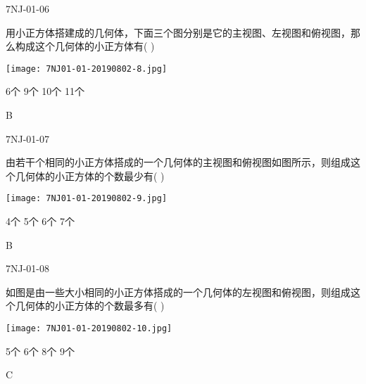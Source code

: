 \begin{defproblem}{7NJ-01-06}%
\begin{onlyproblem}%
用小正方体搭建成的几何体，下面三个图分别是它的主视图、左视图和俯视图，那么构成这个几何体的小正方体有(    )
\begin{center}
\texttt{[image: 7NJ01-01-20190802-8.jpg]}
\end{center}

\xx
{6个}
{9个}
{10个}
{11个}

\end{onlyproblem}%
\begin{onlysolution}%
\begin{solution}%
B
\end{solution}%
\end{onlysolution}%
\end{defproblem}



\begin{defproblem}{7NJ-01-07}%
\begin{onlyproblem}%
由若干个相同的小正方体搭成的一个几何体的主视图和俯视图如图所示，则组成这个几何体的小正方体的个数最少有(    )
\begin{center}
\texttt{[image: 7NJ01-01-20190802-9.jpg]}
\end{center}

\xx
{4个}
{5个}
{6个}
{7个}


\end{onlyproblem}%
\begin{onlysolution}%
\begin{solution}%
B
\end{solution}%
\end{onlysolution}%
\end{defproblem}




\begin{defproblem}{7NJ-01-08}%
\begin{onlyproblem}%
如图是由一些大小相同的小正方体搭成的一个几何体的左视图和俯视图，则组成这个几何体的小正方体的个数最多有(    )
\begin{center}
\texttt{[image: 7NJ01-01-20190802-10.jpg]}
\end{center}

\xx
{5个}
{6个}
{8个}
{9个}


\end{onlyproblem}%
\begin{onlysolution}%
\begin{solution}%
C
\end{solution}%
\end{onlysolution}%
\end{defproblem}



